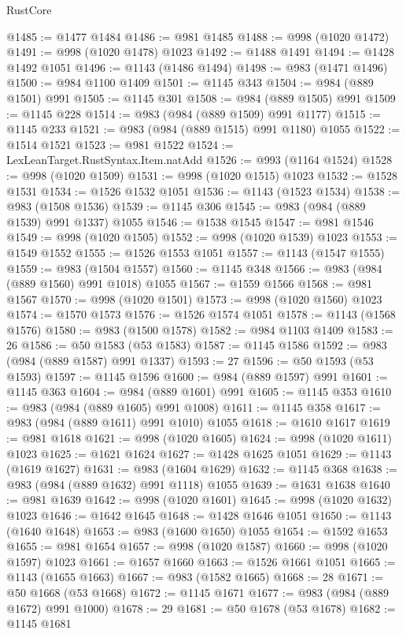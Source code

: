 \begin{lexlean}{RustCore}
\begin{coremodule}
@1485 := @1477 @1484
@1486 := @981 @1485
@1488 := @998 (@1020 @1472)
@1491 := @998 (@1020 @1478) @1023
@1492 := @1488 @1491
@1494 := @1428 @1492 @1051
@1496 := @1143 (@1486 @1494)
@1498 := @983 (@1471 @1496)
@1500 := @984 @1100 @1409
@1501 := @1145 @343
@1504 := @984 (@889 @1501) @991
@1505 := @1145 @301
@1508 := @984 (@889 @1505) @991
@1509 := @1145 @228
@1514 := @983 (@984 (@889 @1509) @991 @1177)
@1515 := @1145 @233
@1521 := @983 (@984 (@889 @1515) @991 @1180) @1055
@1522 := @1514 @1521
@1523 := @981 @1522
@1524 := LexLeanTarget.RustSyntax.Item.natAdd
@1526 := @993 (@1164 @1524)
@1528 := @998 (@1020 @1509)
@1531 := @998 (@1020 @1515) @1023
@1532 := @1528 @1531
@1534 := @1526 @1532 @1051
@1536 := @1143 (@1523 @1534)
@1538 := @983 (@1508 @1536)
@1539 := @1145 @306
@1545 := @983 (@984 (@889 @1539) @991 @1337) @1055
@1546 := @1538 @1545
@1547 := @981 @1546
@1549 := @998 (@1020 @1505)
@1552 := @998 (@1020 @1539) @1023
@1553 := @1549 @1552
@1555 := @1526 @1553 @1051
@1557 := @1143 (@1547 @1555)
@1559 := @983 (@1504 @1557)
@1560 := @1145 @348
@1566 := @983 (@984 (@889 @1560) @991 @1018) @1055
@1567 := @1559 @1566
@1568 := @981 @1567
@1570 := @998 (@1020 @1501)
@1573 := @998 (@1020 @1560) @1023
@1574 := @1570 @1573
@1576 := @1526 @1574 @1051
@1578 := @1143 (@1568 @1576)
@1580 := @983 (@1500 @1578)
@1582 := @984 @1103 @1409
@1583 := 26
@1586 := @50 @1583 (@53 @1583)
@1587 := @1145 @1586
@1592 := @983 (@984 (@889 @1587) @991 @1337)
@1593 := 27
@1596 := @50 @1593 (@53 @1593)
@1597 := @1145 @1596
@1600 := @984 (@889 @1597) @991
@1601 := @1145 @363
@1604 := @984 (@889 @1601) @991
@1605 := @1145 @353
@1610 := @983 (@984 (@889 @1605) @991 @1008)
@1611 := @1145 @358
@1617 := @983 (@984 (@889 @1611) @991 @1010) @1055
@1618 := @1610 @1617
@1619 := @981 @1618
@1621 := @998 (@1020 @1605)
@1624 := @998 (@1020 @1611) @1023
@1625 := @1621 @1624
@1627 := @1428 @1625 @1051
@1629 := @1143 (@1619 @1627)
@1631 := @983 (@1604 @1629)
@1632 := @1145 @368
@1638 := @983 (@984 (@889 @1632) @991 @1118) @1055
@1639 := @1631 @1638
@1640 := @981 @1639
@1642 := @998 (@1020 @1601)
@1645 := @998 (@1020 @1632) @1023
@1646 := @1642 @1645
@1648 := @1428 @1646 @1051
@1650 := @1143 (@1640 @1648)
@1653 := @983 (@1600 @1650) @1055
@1654 := @1592 @1653
@1655 := @981 @1654
@1657 := @998 (@1020 @1587)
@1660 := @998 (@1020 @1597) @1023
@1661 := @1657 @1660
@1663 := @1526 @1661 @1051
@1665 := @1143 (@1655 @1663)
@1667 := @983 (@1582 @1665)
@1668 := 28
@1671 := @50 @1668 (@53 @1668)
@1672 := @1145 @1671
@1677 := @983 (@984 (@889 @1672) @991 @1000)
@1678 := 29
@1681 := @50 @1678 (@53 @1678)
@1682 := @1145 @1681

\end{coremodule}
\end{lexlean}
